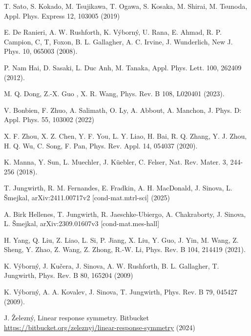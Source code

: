 \documentclass[prb,showpacs,amsmath,amssymb,superscriptaddress,twocolumn,floatfix]{revtex4-1}
\begin{document}
\begin{thebibliography}{99}
 T. Sato, S. Kokado, M. Tsujikawa, T. Ogawa, S. Kosaka, M. Shirai, M. Tsunoda, Appl. Phys. Express 12, 103005 (2019)

 E. De Ranieri, A. W. Rushforth, K. V\'yborn\'y, U. Rana, E. Ahmad, R. P. Campion, C, T, Foxon, B. L. Gallagher, A. C. Irvine, J. Wunderlich, New J. Phys. 10, 065003 (2008).%


 P. Nam Hai, D. Sasaki, L. Duc Anh, M. Tanaka, Appl. Phys. Lett. 100, 262409 (2012). %

 M. Q. Dong, Z.-X. Guo , X. R. Wang, Phys. Rev. B 108, L020401 (2023). %

 V. Bonbien, F. Zhuo, A. Salimath, O. Ly, A. Abbout, A. Manchon, J. Phys. D: Appl. Phys. 55, 103002 (2022)

 X. F. Zhou, X. Z. Chen, Y. F. You, L. Y. Liao, H. Bai, R. Q. Zhang, Y. J. Zhou, H. Q. Wu, C. Song, F. Pan, Phys. Rev. Appl. 14, 054037 (2020). %


 K. Manna, Y. Sun, L. Muechler, J. K\"uebler, C. Felser, %
Nat. Rev. Mater. 3, 244-256 (2018). %

 T. Jungwirth, R. M. Fernandes, E. Fradkin, A. H. MacDonald, J. Sinova, L. \v{S}mejkal, arXiv:2411.00717v2 [cond-mat.mtrl-sci] (2025) 

 A. Birk Hellenes, T. Jungwirth, R. Jaeschke-Ubiergo, A. Chakraborty, J. Sinova, L. \v{S}mejkal, arXiv:2309.01607v3 [cond-mat.mes-hall]

 H. Yang, Q. Liu, Z. Liao, L. Si, P. Jiang, X. Liu, Y. Guo, J. Yin, M. Wang, Z. Sheng, Y. Zhao, Z. Wang, Z. Zhong, R.-W. Li, Phys. Rev. B 104, 214419 (2021).

 K. V\'{y}born\'{y}, J. Ku\v{c}era, J. Sinova, A. W. Rushforth, B. L. Gallagher, T. Jungwirth, Phys. Rev. B 80, 165204 (2009)%

 K. V\'yborn\'y, A. A. Kovalev, J. Sinova, T. Jungwirth, Phys. Rev. B 79, 045427 (2009). %

 J. \v{Z}elezn\'y, Linear response symmetry. Bitbucket \url{https://bitbucket.org/zeleznyj/linear-response-symmetry} (2024)


\end{thebibliography}
\end{document}
